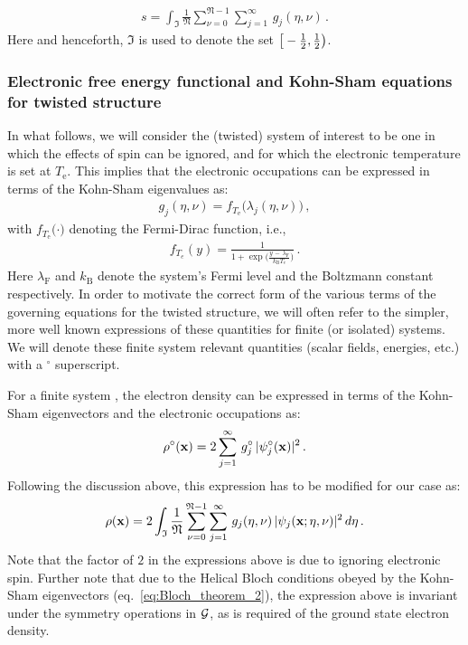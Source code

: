\documentclass[preprint,12pt, 3p, sort&compress]{elsarticle}
\begin{document}
\begin{align}
{s} = \int_{\mathfrak{I}}\frac{1}{\mathfrak{N}}\sum_{\nu = 0}^{\mathfrak{N}-1}\sum_{j=1}^{\infty}\,g_j(\eta,\nu)\,.
\end{align}
Here and henceforth, $\mathfrak{I}$ is used to denote the set $\big[-\frac{1}{2},\frac{1}{2} \big)$.
\subsubsection{Electronic free energy functional and Kohn-Sham equations for twisted structure}
\label{subsubsec:KS_eqn}
In what follows, we will consider the (twisted) system of interest to be one in which the effects of spin can be ignored, and for which the electronic temperature is set at $T_{\text{e}}$. This implies that the electronic occupations can be expressed in terms of the Kohn-Sham eigenvalues as:
\begin{align}
g_j(\eta,\nu) = f_{T_{\text{e}}}\big(\lambda_j(\eta, \nu)\big)\,,
\end{align}
with $f_{T_{\text{e}}}\big(\cdot)$ denoting the Fermi-Dirac function, i.e.,
\begin{align}
\label{eq:Fermi_Dirac}
f_{T_e}(y) = \frac{1}{1 + \exp\big({\frac{y\,-\,\lambda_{\text{F}}}{k_{\text{B}} T_{\text{e}}}}\big)}\,.
\end{align}
Here $\lambda_{\text{F}}$ and $k_{\text{B}}$ denote the system's Fermi level and the Boltzmann constant respectively.  In order to motivate the correct form of the various terms of the governing equations for the twisted structure, we will often refer to the simpler, more well known expressions of these quantities for finite (or isolated) systems. We will denote these finite system relevant quantities (scalar fields, energies, etc.) with a $^\circ$ superscript. 

For a finite system \citep{ghosh2019symmetry, ghosh2017sparc_1}, the electron density can be expressed in terms of the Kohn-Sham eigenvectors and the electronic occupations as: 
\begin{align}
\displaystyle \rho^{\circ}({\bf x}) = 2\sum_{j=1}^{\infty}\,g_j^{\circ}\,\lvert \psi_j^{\circ}({\bf x})\rvert^2\,.
\end{align} 
Following the discussion above, this expression has to be modified for our case as:
\begin{align}
\rho({\bf x}) = 2\int_{\mathfrak{I}}\frac{1}{\mathfrak{N}}\sum_{\nu = 0}^{\mathfrak{N}-1}\sum_{j=1}^{\infty}\,g_j(\eta,\nu)\,\lvert \psi_j({\bf x}; \eta, \nu)\rvert^2\,d\eta\,.
\label{eq:electron_density_expression}
\end{align}
Note that the factor of $2$ in the expressions above is due to ignoring electronic spin. Further note that due to the Helical Bloch conditions obeyed by the Kohn-Sham eigenvectors (eq.~\ref{eq:Bloch_theorem_2}), the expression above is invariant under the symmetry operations in ${\cal G}$, as is required of the ground state electron density.
\end{document}
